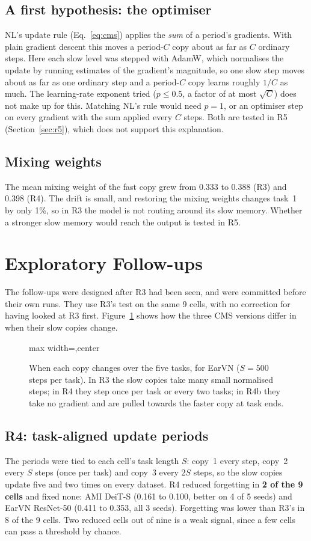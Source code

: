 \documentclass[12pt,a4paper]{report}
\newcommand{\diagram}[1]{\begin{adjustbox}{max width=\textwidth,center}\end{adjustbox}}
\begin{document}
\subsection{A first hypothesis: the optimiser}
NL's update rule (Eq.~\ref{eq:cms}) applies the \emph{sum} of a period's gradients. With plain gradient descent this moves a period-$C$ copy about as far as $C$ ordinary steps. Here each slow level was stepped with AdamW, which normalises the update by running estimates of the gradient's magnitude, so one slow step moves about as far as one ordinary step and a period-$C$ copy learns roughly $1/C$ as much. The learning-rate exponent tried ($p \le 0.5$, a factor of at most $\sqrt{C}$) does not make up for this. Matching NL's rule would need $p = 1$, or an optimiser step on every gradient with the sum applied every $C$ steps. Both are tested in R5 (Section~\ref{sec:r5}), which does not support this explanation.

\subsection{Mixing weights}
The mean mixing weight of the fast copy grew from 0.333 to 0.388 (R3) and 0.398 (R4). The drift is small, and restoring the mixing weights changes task~1 by only 1\%, so in R3 the model is not routing around its slow memory. Whether a stronger slow memory would reach the output is tested in R5.

\section{Exploratory Follow-ups}
The follow-ups were designed after R3 had been seen, and were committed before their own runs. They use R3's test on the same 9 cells, with no correction for having looked at R3 first. Figure~\ref{fig:timelines} shows how the three CMS versions differ in when their slow copies change.

\begin{figure}[H]
\centering
\diagram{timelines}
\caption{When each copy changes over the five tasks, for EarVN ($S = 500$ steps per task). In R3 the slow copies take many small normalised steps; in R4 they step once per task or every two tasks; in R4b they take no gradient and are pulled towards the faster copy at task ends.}
\label{fig:timelines}
\end{figure}

\subsection{R4: task-aligned update periods}
The periods were tied to each cell's task length $S$: copy~1 every step, copy~2 every $S$ steps (once per task) and copy~3 every $2S$ steps, so the slow copies update five and two times on every dataset. R4 reduced forgetting in \textbf{2 of the 9 cells} and fixed none: AMI DeiT-S (0.161 to 0.100, better on 4 of 5 seeds) and EarVN ResNet-50 (0.411 to 0.353, all 3 seeds). Forgetting was lower than R3's in 8 of the 9 cells. Two reduced cells out of nine is a weak signal, since a few cells can pass a threshold by chance.
\end{document}
